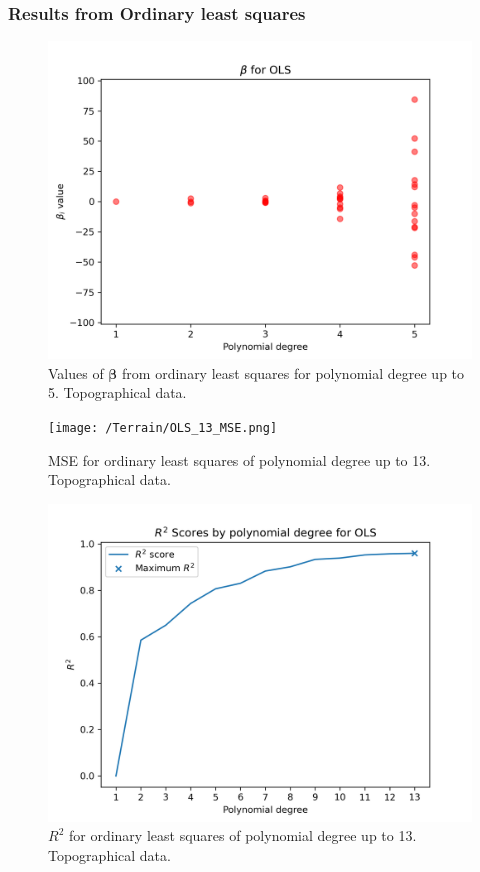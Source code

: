 \documentclass{article}
\begin{document}
\subsubsection{Results from Ordinary least squares}
\begin{figure}[htbp]
    \centering
    \includegraphics[width=\textwidth*2/3]{Terrain/OLS_5_betas.png}
    \caption{Values of $\boldsymbol{\beta}$ from ordinary least squares for polynomial degree up to 5. Topographical data.}
    \label{fig:TerrainOLS5Beta}
\end{figure}

\begin{figure}[htbp]
    \centering
    \texttt{[image: /Terrain/OLS\_13\_MSE.png]}
    \caption{MSE for ordinary least squares of polynomial degree up to 13. Topographical data.}
    \label{fig:TerrainOLS5MSE}
\end{figure}

\begin{figure}[htbp]
    \centering
    \includegraphics[width=\textwidth*2/3]{Project1/figures/Terrain/OLS_13_R2.png}
    \caption{$R^2$ for ordinary least squares of polynomial degree up to 13. Topographical data.}
    \label{fig:TerrainOLS5R2}
\end{figure}
\end{document}
